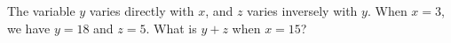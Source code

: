 The variable $y$ varies directly with $x$, and $z$ varies inversely with $y$. When $x=3$, we have $y=18$ and $z=5$. What is $y+z$ when $x=15$?
